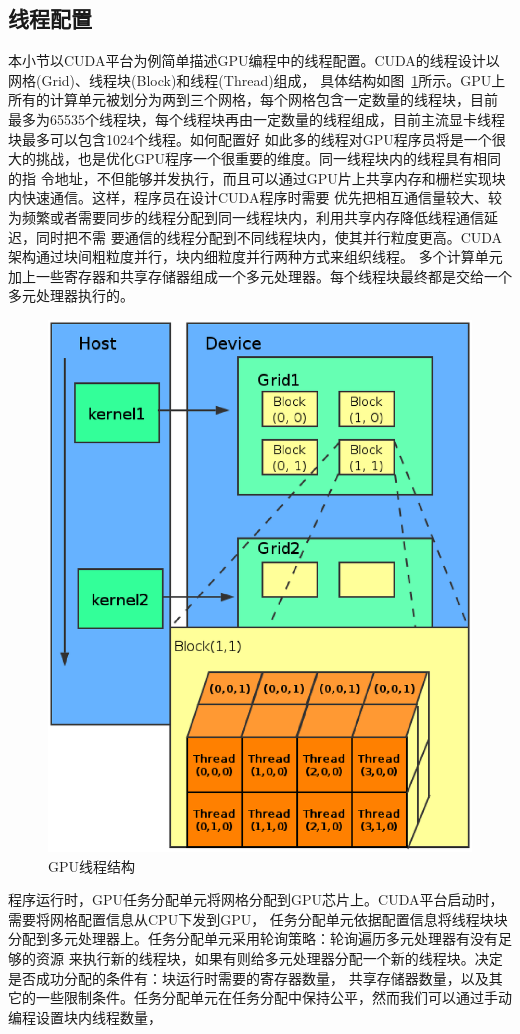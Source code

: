 \subsection{线程配置}
本小节以CUDA平台为例简单描述GPU编程中的线程配置。CUDA的线程设计以网格(Grid)、线程块(Block)和线程(Thread)组成，
具体结构如图~\ref{figure6}所示。GPU上所有的计算单元被划分为两到三个网格，每个网格包含一定数量的线程块，目前
最多为65535个线程块，每个线程块再由一定数量的线程组成，目前主流显卡线程块最多可以包含1024个线程。如何配置好
如此多的线程对GPU程序员将是一个很大的挑战，也是优化GPU程序一个很重要的维度。同一线程块内的线程具有相同的指
令地址，不但能够并发执行，而且可以通过GPU片上共享内存和栅栏实现块内快速通信。这样，程序员在设计CUDA程序时需要
优先把相互通信量较大、较为频繁或者需要同步的线程分配到同一线程块内，利用共享内存降低线程通信延迟，同时把不需
要通信的线程分配到不同线程块内，使其并行粒度更高。CUDA架构通过块间粗粒度并行，块内细粒度并行两种方式来组织线程。
多个计算单元加上一些寄存器和共享存储器组成一个多元处理器。每个线程块最终都是交给一个多元处理器执行的。
\begin{figure}
\centering
\includegraphics[width=0.6\linewidth]{figure6.eps}
\caption{GPU线程结构}\label{figure6}
\end{figure}
程序运行时，GPU任务分配单元将网格分配到GPU芯片上。CUDA平台启动时，需要将网格配置信息从CPU下发到GPU，
任务分配单元依据配置信息将线程块块分配到多元处理器上。任务分配单元采用轮询策略：轮询遍历多元处理器有没有足够的资源
来执行新的线程块，如果有则给多元处理器分配一个新的线程块。决定是否成功分配的条件有：块运行时需要的寄存器数量，
共享存储器数量，以及其它的一些限制条件。任务分配单元在任务分配中保持公平，然而我们可以通过手动编程设置块内线程数量，
